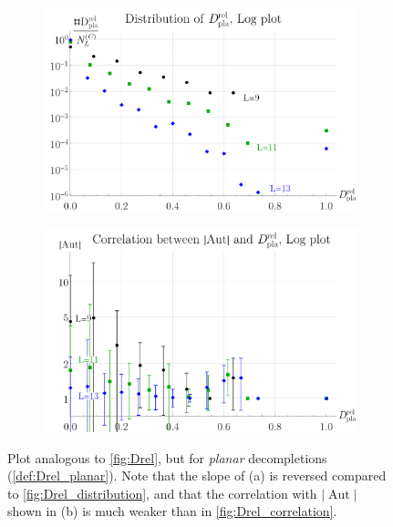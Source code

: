 \documentclass[12pt,a4paper]{article}
\newcommand{\abs}[1]{\lvert #1 \rvert}
\newcommand{\Aut}{\operatorname{Aut}}
\renewcommand{\|}{\rule[-0.4ex]{0.2ex}{1.2em}}
\begin{document}
\begin{figure}[htb]
	\centering
	\begin{subfigure}[b]{.47 \textwidth}
		\includegraphics[width=\textwidth]{Drelpla_distribution}
		\subcaption{}
		\label{fig:Drelpla_distribution}
	\end{subfigure}
	\begin{subfigure}[b]{.47 \textwidth}
		\includegraphics[width=\textwidth]{Drelpla_correlation}
		\subcaption{}
		\label{fig:Drelpla_correlation}
	\end{subfigure}
	\caption{Plot analogous to \cref{fig:Drel}, but for \emph{planar} decompletions (\cref{def:Drel_planar}). Note that the slope of (a) is reversed compared to \cref{fig:Drel_distribution}, and that the correlation with $\abs{\Aut}$ shown in (b) is much weaker than in \cref{fig:Drel_correlation}.}
	\label{fig:Drelpla}
\end{figure}
\end{document}
